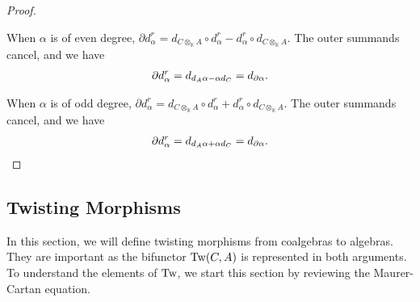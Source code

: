 \documentclass[../thesis.tex]{subfiles}
\begin{document}
\begin{proof}
\begin{center}
\begin{tikzpicture}
                    \end{tikzpicture}
                \end{center}

                When $\alpha$ is of even degree, $\partial d_\alpha^r = d_{C\otimes_\mathbb{K}A}\circ d^r_\alpha - d^r_\alpha\circ d_{C\otimes_\mathbb{K}A}$. The outer summands cancel, and we have
                \begin{align*}
                    \partial d_\alpha^r = d_{d_A \alpha - \alpha d_C} = d_{\partial \alpha}\tt{.}
                \end{align*}

                When $\alpha$ is of odd degree, $\partial d_\alpha^r = d_{C\otimes_\mathbb{K}A}\circ d^r_\alpha + d^r_\alpha\circ d_{C\otimes_\mathbb{K}A}$. The outer summands cancel, and we have
                \begin{align*}
                    \partial d_\alpha^r = d_{d_A \alpha + \alpha d_C} = d_{\partial \alpha}\tt{.}
                \end{align*}
            \end{proof}

    \subsection{Twisting Morphisms}

            In this section, we will define twisting morphisms from coalgebras to algebras. They are important as the bifunctor $\tt{Tw}(C, A)$ is represented in both arguments. To understand the elements of $\tt{Tw}$, we start this section by reviewing the Maurer-Cartan equation.
\end{document}
